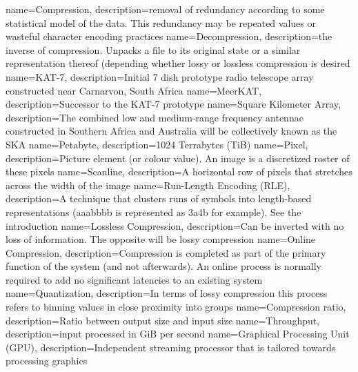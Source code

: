  {name={Compression},
  description={removal of redundancy according to some statistical model of the data. This redundancy may be repeated values or wasteful character encoding practices}
 }
 {name={Decompression},
  description={the inverse of compression. Unpacks a file to its original state or a similar representation thereof (depending whether lossy or lossless compression is
  desired}
 }
 {name={KAT-7},
  description={Initial 7 dish prototype radio telescope array constructed near Carnarvon, South Africa}
 }
 {name={MeerKAT},
  description={Successor to the KAT-7 prototype}
 }
 {
  name={Square Kilometer Array},
  description={The combined low and medium-range frequency antennae constructed in Southern Africa and Australia will be collectively known as the SKA}
 }
 {
  name={Petabyte},
  description={1024 Terrabytes (TiB)}
 }
 {
  name={Pixel},
  description={Picture element (or colour value). An image is a discretized roster of these pixels}
 }
 {
  name={Scanline},
  description={A horizontal row of pixels that stretches across the width of the image}
 }
 {
  name={Run-Length Encoding (RLE)},
  description={A technique that clusters runs of symbols into length-based representations (aaabbbb is represented as 3a4b for example). See the introduction}
 }
 {
  name={Lossless Compression},
  description={Can be inverted with no loss of information. The opposite will be lossy compression}
 }
 {
  name={Online Compression},
  description={Compression is completed as part of the primary function of the system (and not afterwards). An online process is normally required to
  add no significant latencies to an existing system}
 }
 {
  name={Quantization},
  description={In terms of lossy compression this process refers to binning values in close proximity into groups}
 }
 {
  name={Compression ratio},
  description={Ratio between output size and input size}
 }
 {
  name={Throughput},
  description={input processed in GiB per second}
 }
 {
  name={Graphical Processing Unit (GPU)},
  description={Independent streaming processor that is tailored towards processing graphics}
 }
